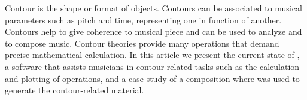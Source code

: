 Contour is the shape or format of objects. Contours can be associated
to musical parameters such as pitch and time, representing one in
function of another. Contours help to give coherence to musical piece
and can be used to analyze and to compose music. Contour theories
provide many operations that demand precise mathematical calculation.
In this article we present the current state of \goiaba{}, a software
that assists musicians in contour related tasks such as the
calculation and plotting of operations, and a case study of a
composition where \goiaba{} was used to generate the contour-related
material.
